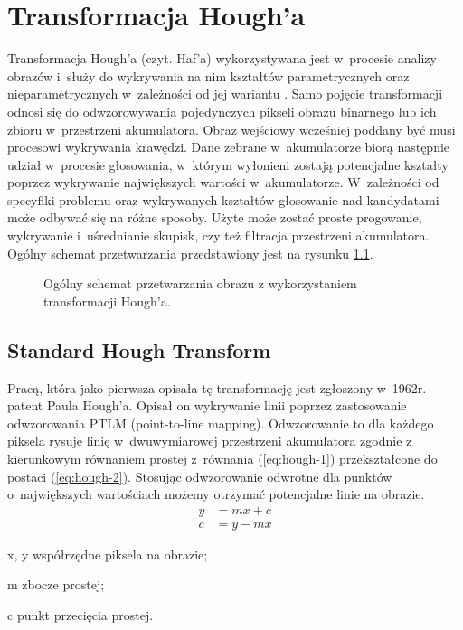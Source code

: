 \chapter{Transformacja Hough'a}
\label{sec:hough}

Transformacja Hough'a (czyt. Haf'a) wykorzystywana jest w~procesie analizy obrazów i~służy do wykrywania na nim kształtów parametrycznych oraz nieparametrycznych w~zależności od jej wariantu \cite{mukhopadhyay2015survey}. Samo pojęcie transformacji odnosi się do odwzorowywania pojedynczych pikseli obrazu binarnego lub ich zbioru w~przestrzeni akumulatora. Obraz wejściowy wcześniej poddany być musi procesowi wykrywania krawędzi. Dane zebrane w~akumulatorze biorą następnie udział w~procesie głosowania, w~którym wyłonieni zostają potencjalne kształty poprzez wykrywanie największych wartości w~akumulatorze. W~zależności od specyfiki problemu oraz wykrywanych kształtów głosowanie nad kandydatami może odbywać się na różne sposoby. Użyte może zostać proste progowanie, wykrywanie i~uśrednianie skupisk, czy też filtracja przestrzeni akumulatora. Ogólny schemat przetwarzania przedstawiony jest na rysunku \ref{fig:hough}.

\begin{figure}
    \centering
    
    \caption{Ogólny schemat przetwarzania obrazu z wykorzystaniem transformacji Hough'a.}
    \label{fig:hough}
\end{figure}

\section{Standard Hough Transform}

Pracą, która jako pierwsza opisała tę transformację jest zgłoszony w~1962r. patent Paula Hough'a. Opisał on wykrywanie linii poprzez zastosowanie odwzorowania PTLM (point-to-line mapping). Odwzorowanie to dla każdego piksela rysuje linię w~dwuwymiarowej przestrzeni akumulatora zgodnie z kierunkowym równaniem prostej z~równania (\ref{eq:hough-1}) przekształcone do postaci (\ref{eq:hough-2}). Stosując odwzorowanie odwrotne dla punktów o~największych wartościach możemy otrzymać potencjalne linie na obrazie.
\begin{align}
    y &= mx+c \label{eq:hough-1}\\
    c &= y-mx \label{eq:hough-2}
\end{align}
\begin{eqexpl}
    \item{x, y} współrzędne piksela na obrazie;
    \item{m} zbocze prostej;
    \item{c} punkt przecięcia prostej.
\end{eqexpl}


